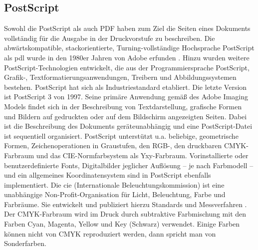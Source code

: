 \subsection{PostScript}
Sowohl die PostScript als auch PDF haben zum Ziel die Seiten eines Dokuments vollständig für die Ausgabe in der Druckvorstufe zu beschreiben. Die abwärtskompatible, stackorientierte, Turning-vollständige Hochsprache PostScript als \gls{pdl} wurde in den 1980er Jahren von Adobe erfunden \cite{adobe-postscript, wiki-postscript}. Hinzu wurden weitere PostScript-Technologien entwickelt, die aus der Programmiersprache PostScript, Grafik-, Textformatierungsanwendungen, Treibern und Abbildungssystemen bestehen. PostScript hat sich als Industriestandard etabliert. Die letzte Version ist PostScript 3 von 1997. Seine primäre Anwendung gemäß des Adobe Imaging Models findet sich in der Beschreibung von Textdarstellung, grafische Formen und Bildern auf gedruckten oder auf dem Bildschirm angezeigten Seiten. Dabei ist die Beschreibung des Dokuments geräteunabhängig und eine PostScript-Datei ist sequentiell organisiert. PostScript unterstützt u.a. beliebige, geometrische Formen, Zeichenoperationen in Graustufen, den RGB-, den druckbaren CMYK-Farbraum und das CIE-Normfarbsystem als Yxy-Farbraum. Vorinstallierte oder benutzerdefinierte Fonts, Digitalbilder jeglicher Auflösung – je nach Farbmodell – und ein allgemeines Koordinatensystem sind in PostScript ebenfalls implementiert. Die \gls{cie} (Internationale Beleuchtungskommission) ist eine unabhängige Non-Profit-Organisation für Licht, Beleuchtung, Farbe und Farbräume. Sie entwickelt und publiziert hierzu Standards und Messverfahren \cite{wiki-cie-de, wiki-cie-engl}. Der CMYK-Farbraum wird im Druck durch subtraktive Farbmischung mit den Farben Cyan, Magenta, Yellow und Key (Schwarz) verwendet. Einige Farben können nicht von CMYK reproduziert werden, dann spricht man von Sonderfarben.
\par
